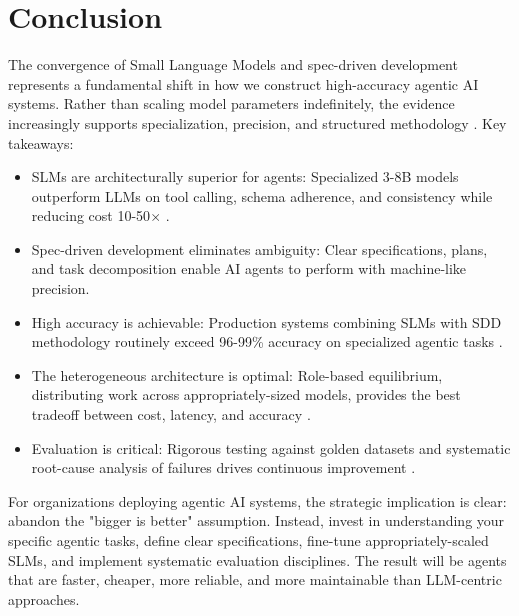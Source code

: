 \documentclass[11pt,a4paper]{article}
\begin{document}
\section{Conclusion}
The convergence of Small Language Models and spec-driven development represents a fundamental shift in how we construct high-accuracy agentic AI systems. Rather than scaling model parameters indefinitely, the evidence increasingly supports specialization, precision, and structured methodology \cite{belcak2025} \cite{nvidia2025} .
Key takeaways:
\begin{itemize}
\item SLMs are architecturally superior for agents: Specialized 3-8B models outperform LLMs on tool calling, schema adherence, and consistency while reducing cost 10-50$\times$\cite{belcak2025} \cite{nvidia2025} .
\item Spec-driven development eliminates ambiguity: Clear specifications, plans, and task decomposition enable AI agents to perform with machine-like precision\cite{jetbrains2025}.
\item High accuracy is achievable: Production systems combining SLMs with SDD methodology routinely exceed 96-99\% accuracy on specialized agentic tasks \cite{nvidia2025} \cite{tableau2025}.
\item The heterogeneous architecture is optimal: Role-based equilibrium, distributing work across appropriately-sized models, provides the best tradeoff between cost, latency, and accuracy \cite{belcak2025} \cite{nvidia2025} .
\item Evaluation is critical: Rigorous testing against golden datasets and systematic root-cause analysis of failures drives continuous improvement \cite{tableau2025}.
\end{itemize}
For organizations deploying agentic AI systems, the strategic implication is clear: abandon the "bigger is better" assumption. Instead, invest in understanding your specific agentic tasks, define clear specifications, fine-tune appropriately-scaled SLMs, and implement systematic evaluation disciplines. The result will be agents that are faster, cheaper, more reliable, and more maintainable than LLM-centric approaches.
\end{document}
